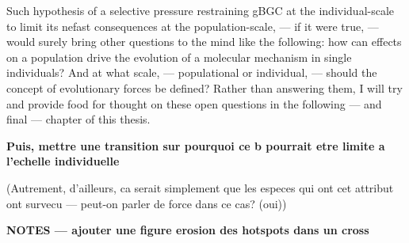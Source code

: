 Such hypothesis of a selective pressure restraining gBGC at the individual-scale to limit its nefast consequences at the population-scale, — if it were true, — would surely bring other questions to the mind like the following:
how can effects on a population drive the evolution of a molecular mechanism in single individuals?
And at what scale, — populational or individual, — should the concept of evolutionary forces be defined?
Rather than answering them, I will try and provide food for thought on these open questions in the following — and final — chapter of this thesis.


\textbf{Puis, mettre une transition sur pourquoi ce b pourrait etre limite a l'echelle individuelle}

(Autrement, d'ailleurs, ca serait simplement que les especes qui ont cet attribut ont survecu — peut-on parler de force dans ce cas? (oui))




\textbf{NOTES — ajouter une figure erosion des hotspots dans un cross}


